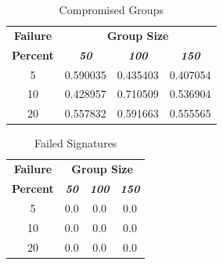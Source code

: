 \documentclass[conference]{IEEEtran}
\begin{document}
        \begin{table}[h!]
            \caption{Compromised Groups}
            \begin{center}
            \begin{tabular}{|c|c|c|c|}
            \hline
            \textbf{Failure}&\multicolumn{3}{|c|}{\textbf{Group Size}} \\
            \cline{2-4} 
            \textbf{Percent} & \textbf{\textit{50}}& \textbf{\textit{100}}& \textbf{\textit{150}} \\
            \hline
            5 &  0.590035 &  0.435403 &  0.407054 \\
            \hline
            10 &  0.428957 &  0.710509 &  0.536904 \\
            \hline
            20 &  0.557832 &  0.591663 &  0.555565 \\
            \hline
            \end{tabular}
            \label{compromised_table1}
            \end{center}
        \end{table}

        \begin{table}[h!]
            \caption{Failed Signatures}
            \begin{center}
            \begin{tabular}{|c|c|c|c|}
            \hline
            \textbf{Failure}&\multicolumn{3}{|c|}{\textbf{Group Size}} \\
            \cline{2-4} 
            \textbf{Percent} & \textbf{\textit{50}}& \textbf{\textit{100}}& \textbf{\textit{150}} \\
            \hline
            5 &  0.0 &  0.0 &  0.0 \\
            \hline
            10 &  0.0 &  0.0 &  0.0 \\
            \hline
            20 &  0.0 &  0.0 &  0.0 \\
            \hline
            \end{tabular}
            \label{failed_table1}
            \end{center}
        \end{table}
\end{document}
